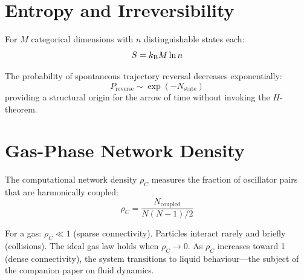 \section{Entropy and Irreversibility}
\label{sec:entropy}

\begin{theorem}
For $M$ categorical dimensions with $n$ distinguishable states each:
\begin{equation}
    S = k_{\mathrm{B}} M \ln n
\end{equation}
\end{theorem}

\begin{theorem}
The probability of spontaneous trajectory reversal decreases exponentially:
\begin{equation}
    P_{\mathrm{reverse}} \sim \exp(-N_{\mathrm{state}})
\end{equation}
providing a structural origin for the arrow of time without invoking the $H$-theorem.
\end{theorem}

\section{Gas-Phase Network Density}
\label{sec:network_density}

\begin{definition}
The computational network density $\rho_C$ measures the fraction of oscillator pairs that are harmonically coupled:
\begin{equation}
    \rho_C = \frac{N_{\mathrm{coupled}}}{N(N-1)/2}
\end{equation}
\end{definition}

For a gas: $\rho_C \ll 1$ (sparse connectivity). Particles interact rarely and briefly (collisions). The ideal gas law holds when $\rho_C \to 0$. As $\rho_C$ increases toward 1 (dense connectivity), the system transitions to liquid behaviour---the subject of the companion paper on fluid dynamics.

